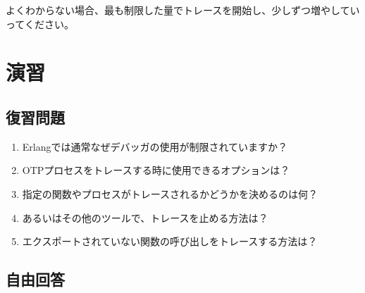 よくわからない場合、最も制限した量でトレースを開始し、少しずつ増やしていってください。

\section{演習}

\subsection*{復習問題}

\begin{enumerate}
	\item Erlangでは通常なぜデバッガの使用が制限されていますか？
	\item OTPプロセスをトレースする時に使用できるオプションは？
	\item 指定の関数やプロセスがトレースされるかどうかを決めるのは何？
	\item {}あるいはその他のツールで、トレースを止める方法は？
	\item エクスポートされていない関数の呼び出しをトレースする方法は？
\end{enumerate}

\subsection*{自由回答}

